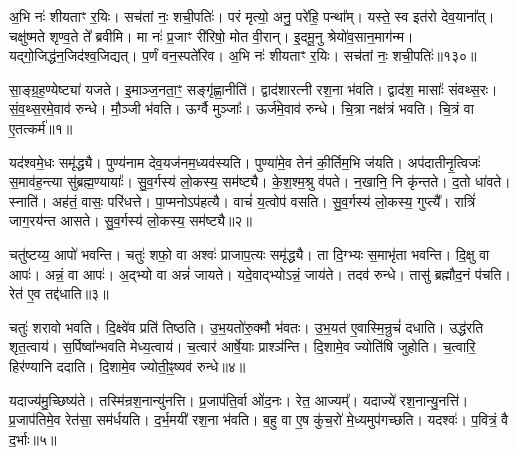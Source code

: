 अ॒भि नः॑ शीयताꣳ र॒यिः।
सच॑तां नः॒ शची॒पतिः॑।
परं मृत्यो॒ अनु॒ परे॑हि॒ पन्था᳚म्।
यस्ते॒ स्व इत॑रो देव॒याना᳚त्।
चक्षु॑ष्मते शृण्व॒ते ते᳚ ब्रवीमि।
मा नः॑ प्र॒जाꣳ री॑रिषो॒ मोत वी॒रान्।
इ॒दमू॒नु श्रेयो॑व॒सान॒माग॑न्म।
यद्गो॒जिद्ध॑न॒जिद॑श्व॒जिद्यत्।
प॒र्णं वन॒स्पते॑रिव।
अ॒भि नः॑ शीयताꣳ र॒यिः।
सच॑तां नः॒ शची॒पतिः॑॥१३०॥\anuvakamend[वन॒स्पता॑व॒द्भ्यो लो॒का द॑धिरे॒ तेज॑ इन्द्रि॒यं धामा॑शीमहीवा॒भिनः॑ शीयताꣳ र॒यिरेकं॑ च]




\setcounter{anuvakam}{0}

सा॒ङ्ग्र॒ह॒ण्येष्ट्या॑ यजते।
इ॒माञ्ज॒नता॒ꣳ॒ सङ्गृ॑ह्णा॒नीति॑।
द्वाद॑शारत्नी रश॒ना भ॑वति।
द्वाद॑श॒ मासाः᳚ संवथ्स॒रः।
सं॒व॒थ्स॒रमे॒वाव॑ रुन्धे।
मौ॒ञ्जी भ॑वति।
ऊर्ग्वै मुञ्जाः᳚।
ऊर्ज॑\-मे॒वाव॑ रुन्धे।
चि॒त्रा नक्ष॑त्रं भवति।
चि॒त्रं वा ए॒तत्कर्म॑॥१॥

यद॑श्वमे॒धः समृ॑द्ध्यै।
पुण्य॑नाम देव॒यज॑नम॒ध्यव॑स्यति।
पुण्या॑मे॒व तेन॑ की॒र्तिम॒भि ज॑यति।
अप॑दातीनृ॒त्विजः॑ स॒माव॑ह॒न्त्या सु॑ब्रह्म॒ण्यायाः᳚।
सु॒व॒र्गस्य॑ लो॒कस्य॒ सम॑ष्ट्यै।
के॒श॒श्म॒श्रु व॑पते।
न॒खानि॒ नि कृ॑न्तते।
द॒तो धा॑वते।
स्नाति॑।
अह॑तं॒ वासः॒ परि॑धत्ते।
पा॒प्मनो\-ऽप॑हत्यै।
वाचं॑ य॒त्वोप॑ वसति।
सु॒व॒र्गस्य॑ लो॒कस्य॒ गुप्त्यै᳚।
रात्रिं॑ जाग॒रय॑न्त आसते।
सु॒व॒र्गस्य॑ लो॒कस्य॒ सम॑ष्ट्यै॥२॥\anuvakamend[कर्म॑ धत्ते॒ पञ्च॑ च]

चतु॑ष्टय्य॒ आपो॑ भवन्ति।
चतुः॑ शफो॒ वा अश्वः॑ प्राजाप॒त्यः समृ॑द्ध्यै।
ता दि॒ग्भ्यः स॒माभृ॑ता भवन्ति।
दि॒क्षु वा आपः॑।
अन्नं॒ वा आपः॑।
अ॒द्भ्यो वा अन्नं॑ जायते।
यदे॒वाद्भ्यो\-ऽन्नं॒ जाय॑ते।
तदव॑ रुन्धे।
तासु॑ ब्रह्मौद॒नं प॑चति।
रेत॑ ए॒व तद्द॑धाति॥३॥

चतुः॑ शरावो भवति।
दि॒क्ष्वे॑व प्रति॑ तिष्ठति।
उ॒भ॒यतो॑रु॒क्मौ भ॑वतः।
उ॒भ॒यत॑ ए॒वास्मि॒न्रुचं॑ दधाति।
उद्ध॑रति शृत॒त्वाय॑।
स॒र्पिष्वा᳚न्भवति मेध्य॒त्वाय॑।
च॒त्वार॑ आर्\mbox{}षे॒याः प्राश्ञ॑न्ति।
दि॒शामे॒व ज्योति॑षि जुहोति।
च॒त्वारि॒ हिर॑ण्यानि ददाति।
दि॒शामे॒व ज्योती॒ꣴ॒ष्यव॑ रुन्धे॥४॥

यदाज्य॑मु॒च्छिष्य॑ते।
तस्मि॑न्रश॒नान्यु॑नत्ति।
प्र॒जाप॑ति॒र्वा ओ॑द॒नः।
रेत॒ आज्यम्᳚।
यदाज्ये॑ रश॒नान्यु॒नत्ति॑।
प्र॒जाप॑तिमे॒व रेत॑सा॒ सम॑र्धयति।
द॒र्भ॒मयी॑ रश॒ना भ॑वति।
ब॒हु वा ए॒ष कु॑च॒रो॑ मे॒ध्यमुप॑गच्छति।
यदश्वः॑।
प॒वित्रं॒ वै द॒र्भाः॥५॥

